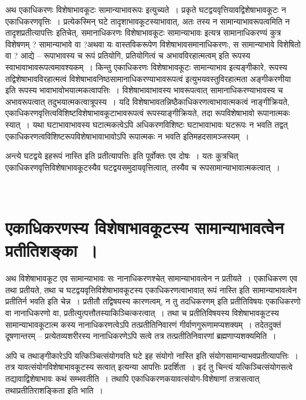 {अथ एकाधिकरणः विशेषाभावकूटः सामान्याभावरूपः इत्युच्यते~। प्रकृते घटद्वयवृत्तियावद्विशेषाभावकूटः न एकाधिकरणवृत्तिः~। प्रत्येकस्मिन् घटे तादृशाभावकूटस्याभावात्, अतः तस्य न सामान्याभावरूपत्वमिति न तादृशप्रतीत्यापत्तिः इतिचेत्, समानाधिकरणः विशेषा\-भावकूटः सामान्याभावः इत्यत्र सामानाधिकरण्यं कुत्र विशेषणम् ? सामान्याभावे वा ?\break अथवा यः वास्तविकरूपेण विशेषाभावसमानाधिकरणः, स सामान्याभावे विशेषितो वा ? आद्ये – रूपाभावस्य च रूपं प्रतियोगि, प्रतियोगित्वं च अभावविरहात्मत्वम् इति रूपस्य स्वाभावाभावरूपत्वमावश्यकम्~। किन्तु एकाधिकरणः विशेषाभावकूटः सामान्याभाव इत्यङ्गी\-कारे, रूपस्य तद्विशेषाभावविरहात्मत्वं विशेषाभावनिष्ठसामानाधिकरण्याभावरूपत्वं इत्युभय\-वस्तुविरहात्मता अङ्गीकरणीया इति रूपस्य  भावाभावोभयात्मकत्वापत्तिः~। विशेषाभावा\-भावस्य भावरूपत्वात् सामानाधिकरण्याभावस्य च अभावरूपत्वात् तदुभयात्मकत्वात्\break रूपस्य~। यदि विशेषाभावतन्निष्ठैकाधिकरणत्वाभावात्मकत्वं नाङ्गीक्रियते, एकाधिकरणवृत्तित्वविशिष्टविशेषाभावकूटाभावरूपत्वं रूपस्याङ्गीक्रियते, तदा रूपविशेषाभावो रूपानात्मकः स्यात्~। यथा घटाभावाभावस्य घटात्मकत्वेऽपि अधिकरणविशिष्टः घटाभावाभावः घटरूपः न भवति तद्वत् एकाधिकरणत्वविशिष्टरूपविशेषाभावाभावोऽपि रूपात्मकः न भवति इति\break महदसामञ्जस्यम्~। 

अन्त्ये घटद्वये इहरूपं नास्ति इति प्रतीत्यापत्तिः इति पूर्वोक्तः एव दोषः~। यतः कुत्रचित् एकाधिकरणवृत्तिविशेषाभावकूटस्यैव घटद्वयसमुदायवृत्तित्वात्, तस्यैव च रूपसामान्याभावात्मकत्वात्~। 

~\\[-2cm]

\section*{एकाधिकरणस्य विशेषाभावकूटस्य सामान्याभावत्वेन प्रतीतिशङ्का~। }
\vskip -3pt

अथ विशेषाभावकूट एव सामान्याभावः सः नानाधिकरणश्चेत् सामान्याभावत्वेन न प्रतीयते~। एकाधिकरण एव तथा प्रतीयते, तथा च घटद्वयवृत्तिविशेषाभावकूटस्य एकाधिकरणत्वाभावात् रूपं नास्ति इति सामान्याभावत्वेन प्रतीतिर्न भवति इति चेन्न~। प्रतीतौ तद्विषयस्य कारणत्वम्, न तु तदधिकरणम् इति प्रतीतिविषयः एकाधिकरणो वा नानाधिकरणो वा, प्रतीत्युत्पत्तौ\break तस्याकिञ्चित्करत्वात्~। तथा च प्रतीतिविषयस्य विशेषाभावकूटस्य सामान्याभावकूटात्म\- कस्य नानाधिकरणत्वेऽपि तत्प्रतीतिनिवारणं गीर्वाणगुरूणामप्यशक्यम्~। तदेतदुक्तं दूषणान्त\-रम् – प्रत्येतव्यशरीरस्य नानाधिकरणेऽपि सत्वे तत्र तत्प्रतीतिनिवारणां ब्रह्मणाप्यशक्यमिति~। 

अपि च तथाङ्गीकारेऽपि यत्किञ्चित्संयोगवति घटे इह संयोगो नास्ति इति संयोग\-सामान्याभवप्रतीत्यापत्तिः~। तत्र यावत्संयोगविशेषाभावकूटस्य सत्वात् इत्यन्या आपत्तिः प्रदर्शिता~। इदं तु चिन्त्यं यत्किञ्चित्संयोगसत्वे तद्यावाद्विशेषाभावः कथं सम्भवतीति~। तथापि एकाधिकरणकयावत्संयोग-विशेषाणां तत्रासत्वात् तथाप्रतीतिराशङ्किता इति भाति~। 

}
